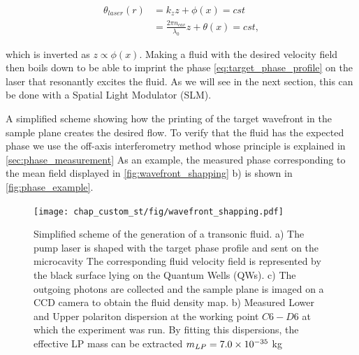 \begin{equation}
    \begin{align}
    \theta_{laser}(r)&=k_zz+\phi(x)=cst \\
                      &=\frac{2\pi n_{cav} }{\lambda_0}z+\theta(x)= cst,
    \end{align}
\end{equation}

which is inverted as $z\propto \phi(x)$. Making a fluid with the desired velocity field then boils down to be able to imprint the phase \autoref{eq:target_phase_profile} on the laser that resonantly excites the fluid. As we will see in the next section, this can be done with a Spatial Light Modulator (SLM). 

 A simplified scheme showing how the printing of the target wavefront in the sample plane creates the desired flow.
To verify that the fluid has the expected phase we use the off-axis interferometry method whose principle is explained in \autoref{sec:phase_measurement}
As an example, the measured phase corresponding to the mean field displayed in \autoref{fig:wavefront_shapping} b) is shown in \autoref{fig:phase_example}.
 
\begin{figure}
    \centering
    \texttt{[image: chap\_custom\_st/fig/wavefront\_shapping.pdf]}
    \caption{Simplified scheme of the generation of a transonic fluid. a) The pump laser is shaped with the target phase profile and sent on the microcavity The corresponding fluid velocity field is represented by the black surface lying on the Quantum Wells (QWs). c) The outgoing photons are collected and the sample 
    plane is imaged on a CCD camera to obtain the fluid density map.  b) Measured Lower and Upper polariton dispersion at the working point $C6-D6$ at which the experiment was run. By fitting this dispersions,
    the effective LP mass can be extracted $m_{LP}= 7.0 \times 10^{-35}$ kg}
    \label{fig:wavefront_shapping}
\end{figure}


\bigskip 

